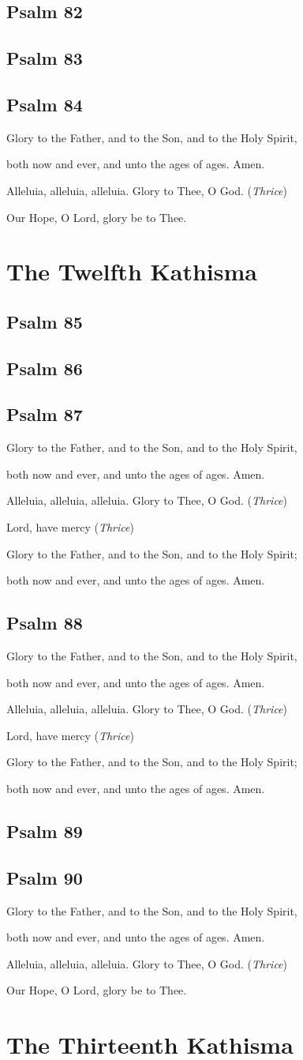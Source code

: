 \documentclass[12pt,openany]{book}
\newcommand{\kathismabreak}{
  \medskip
  \begin{center}
  \begin{footnotesize}
  Glory to the Father, and to the Son, and to the Holy Spirit,
  
  both now and ever, and unto the ages of ages. Amen.

  Alleluia, alleluia, alleluia. Glory to Thee, O God. (\textit{Thrice})

  Lord, have mercy (\textit{Thrice})

  Glory to the Father, and to the Son, and to the Holy Spirit;
  
  both now and ever, and unto the ages of ages. Amen.
  \end{footnotesize}
  \end{center}
  \smallbreak
}
\newcommand{\kathismaend}{
  \medskip
  \begin{center}
  \begin{footnotesize}
  Glory to the Father, and to the Son, and to the Holy Spirit,
  
  both now and ever, and unto the ages of ages. Amen.

  Alleluia, alleluia, alleluia. Glory to Thee, O God. (\textit{Thrice})

  Our Hope, O Lord, glory be to Thee.
  \end{footnotesize}
  \end{center}
  \smallbreak
}
\begin{document}
\section{Psalm 82}

\smallskip
\section{Psalm 83}

\smallskip
\section{Psalm 84}


\pagebreak %
\kathismaend

\chapter*{The Twelfth Kathisma}
\smallskip
\section{Psalm 85}

\smallskip
\section{Psalm 86}

\smallskip
\section{Psalm 87}


\kathismabreak
\smallskip
\section{Psalm 88}


\kathismabreak
\smallskip
\section{Psalm 89}

\smallskip
\section{Psalm 90}


\kathismaend

\chapter*{The Thirteenth Kathisma}
\smallskip
\end{document}
